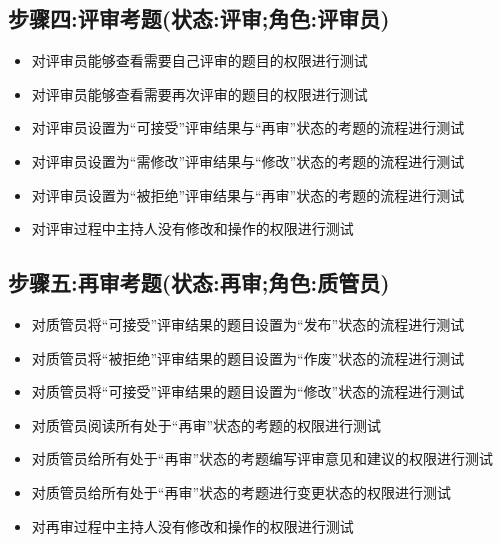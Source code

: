 \documentclass[hyperref, a4paper]{ctexart}
\providecommand{\tightlist}{%
  \setlength{\itemsep}{0pt}\setlength{\parskip}{0pt}}
\begin{document}
\hypertarget{ux6b65ux9aa4ux56dbux8bc4ux5ba1ux8003ux9898ux72b6ux6001ux8bc4ux5ba1ux89d2ux8272ux8bc4ux5ba1ux5458}{%
\subsection{步骤四:评审考题(状态:评审;角色:评审员)}\label{ux6b65ux9aa4ux56dbux8bc4ux5ba1ux8003ux9898ux72b6ux6001ux8bc4ux5ba1ux89d2ux8272ux8bc4ux5ba1ux5458}}

\begin{itemize}
\tightlist
\item
  对评审员能够查看需要自己评审的题目的权限进行测试
\item
  对评审员能够查看需要再次评审的题目的权限进行测试
\item
  对评审员设置为``可接受''评审结果与``再审''状态的考题的流程进行测试
\item
  对评审员设置为``需修改''评审结果与``修改''状态的考题的流程进行测试
\item
  对评审员设置为``被拒绝''评审结果与``再审''状态的考题的流程进行测试
\item
  对评审过程中主持人没有修改和操作的权限进行测试
\end{itemize}

\hypertarget{ux6b65ux9aa4ux4e94ux518dux5ba1ux8003ux9898ux72b6ux6001ux518dux5ba1ux89d2ux8272ux8d28ux7ba1ux5458}{%
\subsection{步骤五:再审考题(状态:再审;角色:质管员)}\label{ux6b65ux9aa4ux4e94ux518dux5ba1ux8003ux9898ux72b6ux6001ux518dux5ba1ux89d2ux8272ux8d28ux7ba1ux5458}}

\begin{itemize}
\tightlist
\item
  对质管员将``可接受''评审结果的题目设置为``发布''状态的流程进行测试
\item
  对质管员将``被拒绝''评审结果的题目设置为``作废''状态的流程进行测试
\item
  对质管员将``可接受''评审结果的题目设置为``修改''状态的流程进行测试
\item
  对质管员阅读所有处于``再审''状态的考题的权限进行测试
\item
  对质管员给所有处于``再审''状态的考题编写评审意见和建议的权限进行测试
\item
  对质管员给所有处于``再审''状态的考题进行变更状态的权限进行测试
\item
  对再审过程中主持人没有修改和操作的权限进行测试
\end{itemize}
\end{document}
